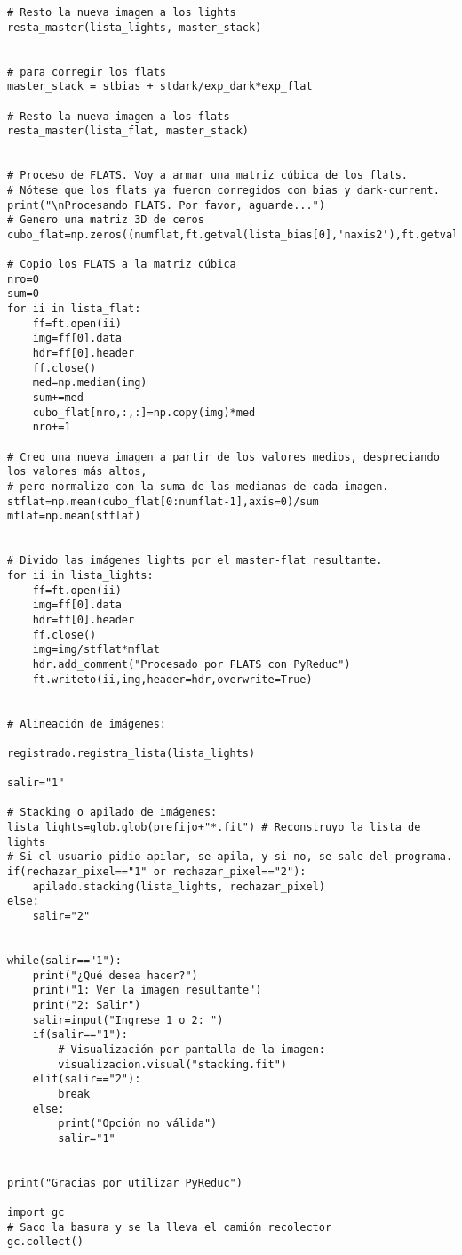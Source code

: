 \begin{lstlisting}[style=python]
# Resto la nueva imagen a los lights
resta_master(lista_lights, master_stack)


# para corregir los flats
master_stack = stbias + stdark/exp_dark*exp_flat

# Resto la nueva imagen a los flats
resta_master(lista_flat, master_stack)


# Proceso de FLATS. Voy a armar una matriz cúbica de los flats.
# Nótese que los flats ya fueron corregidos con bias y dark-current.
print("\nProcesando FLATS. Por favor, aguarde...")
# Genero una matriz 3D de ceros
cubo_flat=np.zeros((numflat,ft.getval(lista_bias[0],'naxis2'),ft.getval(lista_bias[0],'naxis1')),dtype=float)

# Copio los FLATS a la matriz cúbica
nro=0
sum=0
for ii in lista_flat:
    ff=ft.open(ii)
    img=ff[0].data
    hdr=ff[0].header
    ff.close()
    med=np.median(img)
    sum+=med
    cubo_flat[nro,:,:]=np.copy(img)*med
    nro+=1

# Creo una nueva imagen a partir de los valores medios, despreciando los valores más altos,
# pero normalizo con la suma de las medianas de cada imagen.
stflat=np.mean(cubo_flat[0:numflat-1],axis=0)/sum
mflat=np.mean(stflat)


# Divido las imágenes lights por el master-flat resultante.
for ii in lista_lights:
    ff=ft.open(ii)
    img=ff[0].data
    hdr=ff[0].header
    ff.close()
    img=img/stflat*mflat
    hdr.add_comment("Procesado por FLATS con PyReduc")
    ft.writeto(ii,img,header=hdr,overwrite=True)

   
# Alineación de imágenes:

registrado.registra_lista(lista_lights)

salir="1"

# Stacking o apilado de imágenes:
lista_lights=glob.glob(prefijo+"*.fit") # Reconstruyo la lista de lights
# Si el usuario pidio apilar, se apila, y si no, se sale del programa.
if(rechazar_pixel=="1" or rechazar_pixel=="2"):
    apilado.stacking(lista_lights, rechazar_pixel)
else:
    salir="2"


while(salir=="1"):
    print("¿Qué desea hacer?")
    print("1: Ver la imagen resultante")
    print("2: Salir")
    salir=input("Ingrese 1 o 2: ")
    if(salir=="1"):
        # Visualización por pantalla de la imagen:
        visualizacion.visual("stacking.fit")
    elif(salir=="2"):
        break
    else:
        print("Opción no válida")
        salir="1"

    
print("Gracias por utilizar PyReduc")

import gc
# Saco la basura y se la lleva el camión recolector
gc.collect()
\end{lstlisting}